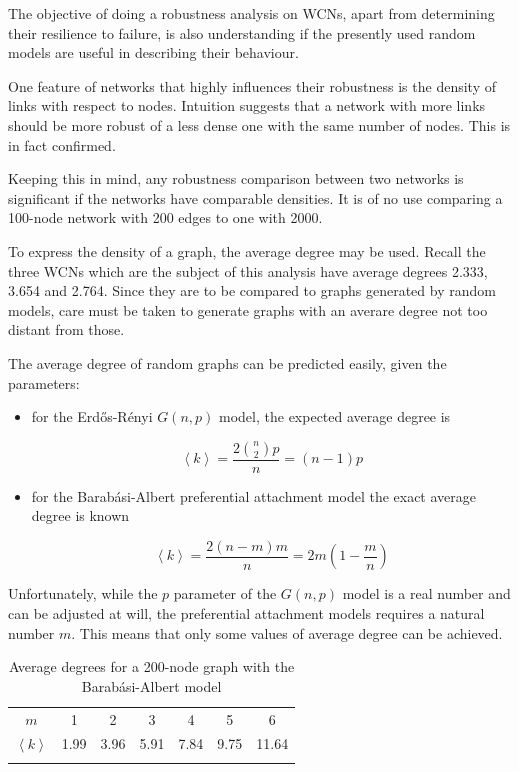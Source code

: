 \documentclass[oneside,openany]{memoir}
\begin{document}
The objective of doing a robustness analysis on WCNs, apart from
determining their resilience to failure, is also understanding if the
presently used random models are useful in describing their behaviour.

One feature of networks that highly influences their robustness is the
density of links with respect to nodes. Intuition suggests that a
network with more links should be more robust of a less dense one with
the same number of nodes. This is in fact confirmed.

Keeping this in mind, any robustness comparison between two networks is
significant if the networks have comparable densities. It is of no use
comparing a 100-node network with 200 edges to one with 2000.

To express the density of a graph, the average degree may be used.
Recall the three WCNs which are the subject of this analysis have
average degrees 2.333, 3.654 and 2.764. Since they are to be compared to
graphs generated by random models, care must be taken to generate graphs
with an averare degree not too distant from those.

The average degree of random graphs can be predicted easily, given the
parameters:

\begin{itemize}
\item
  for the Erd\H{o}s-Rényi $G(n,p)$ model, the expected average degree is

  \begin{equation}
  \left< k \right> = \frac{2 \binom{n}{2} p}{n} = (n-1)p
  \end{equation}
\item
  for the Barabási-Albert preferential attachment model the exact
  average degree is known

  \begin{equation}
  \left< k \right> = \frac{2 (n-m)m}{n} = 2m\left( 1 - \frac{m}{n} \right)
  \end{equation}
\end{itemize}

Unfortunately, while the $p$ parameter of the $G(n,p)$ model is a real
number and can be adjusted at will, the preferential attachment models
requires a natural number $m$. This means that only some values of
average degree can be achieved.

\begin{longtable}[c]{@{}ccccccc@{}}
\toprule\addlinespace
$m$ & 1 & 2 & 3 & 4 & 5 & 6
\\\addlinespace
$\left< k \right>$ & 1.99 & 3.96 & 5.91 & 7.84 & 9.75 & 11.64
\\\addlinespace
\bottomrule
\addlinespace
\caption{Average degrees for a 200-node graph with the Barabási-Albert
model}
\end{longtable}
\end{document}
